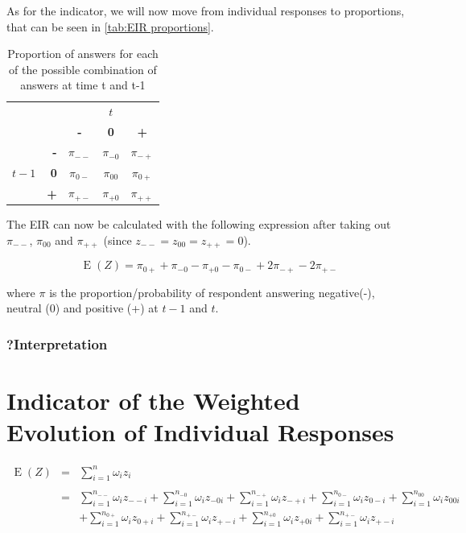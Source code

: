 \documentclass[12pt,a4paper,oneside]{book}
\DeclareMathOperator{\E}{E}
\begin{document}
As for the indicator, we will now move from individual responses to proportions, that can be seen in \autoref{tab:EIR proportions}.

\begin{table}[H]
    \centering
    \begin{tabular}{r | r | c c c | }
    \multicolumn{1}{r}{} & \multicolumn{1}{r}{} &    \multicolumn{3}{c}{$t$} \\ \cline{3-5}
    \multicolumn{1}{r}{} &         & \textbf{-} & \textbf{0} & \textbf{+} \\ \cline{2-5}
            &    \textbf{-} & $\pi_{--}$    & $\pi_{-0}$    & $\pi_{-+}$ \\ 
    $t-1$ & \textbf{0} & $\pi_{0-}$    & $\pi_{00}$    & $\pi_{0+}$    \\
            &    \textbf{+} & $\pi_{+-}$    & $\pi_{+0}$    & $\pi_{++}$ \\ \cline{2-5}
    \end{tabular}    
    \caption{Proportion of answers for each of the possible combination of answers at time t and t-1}
    \label{tab:EIR proportions}
\end{table}

The EIR can now be calculated with the following expression after taking out $\pi_{--}$, $\pi_{00}$ and $\pi_{++}$ (since $z_{--} = z_{00} = z_{++} = 0$).

\begin{equation}
    \E(Z) = \pi_{0+} + \pi_{-0} - \pi_{+0} - \pi_{0-} +2\pi_{-+} -2\pi_{+-} 
\end{equation}

where $\pi$ is the proportion/probability of respondent answering negative(-), neutral (0) and positive (+) at $t-1$ and $t$. 


\subsubsection{?Interpretation}


\section{Indicator of the Weighted Evolution of Individual Responses}

\begin{eqnarray}
    \E(Z) &=&  \sum_{i=1}^n \omega_i z_i \\ \nonumber \\
        &=& \sum_{i=1}^{n_{--}} \omega_i z_{--i} 
     + \sum_{i=1}^{n_{-0}} \omega_i z_{-0i}  
    + \sum_{i=1}^{n_{-+}} \omega_i z_{-+i} 
    + \sum_{i=1}^{n_{0-}} \omega_i z_{0-i}  
    + \sum_{i=1}^{n_{00}} \omega_i z_{00i}   \nonumber  \\
    &&  + \sum_{i=1}^{n_{0+}} \omega_i z_{0+i} 
    + \sum_{i=1}^{n_{+-}} \omega_i z_{+-i} 
    + \sum_{i=1}^{n_{+0}} \omega_i z_{+0i} 
    + \sum_{i=1}^{n_{+-}} \omega_i z_{+-i} 
\end{eqnarray}
\end{document}
